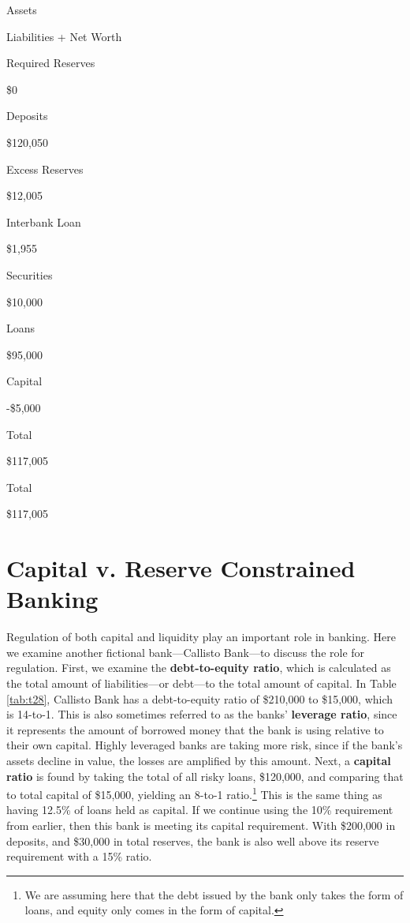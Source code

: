 \documentclass[
]{book}
\begin{document}
Assets

Liabilities + Net Worth

Required Reserves

\$0

Deposits

\$120,050

Excess Reserves

\$12,005

Interbank Loan

\$1,955

Securities

\$10,000

Loans

\$95,000

Capital

-\$5,000

Total

\$117,005

Total

\$117,005

\hypertarget{capital-v.-reserve-constrained-banking}{%
\section{Capital v. Reserve Constrained Banking}\label{capital-v.-reserve-constrained-banking}}

Regulation of both capital and liquidity play an important role in banking. Here we examine another fictional bank---Callisto Bank---to discuss the role for regulation. First, we examine the \textbf{debt-to-equity ratio}, which is calculated as the total amount of liabilities---or debt---to the total amount of capital. In Table \ref{tab:t28}, Callisto Bank has a debt-to-equity ratio of \$210,000 to \$15,000, which is 14-to-1. This is also sometimes referred to as the banks' \textbf{leverage ratio}, since it represents the amount of borrowed money that the bank is using relative to their own capital. Highly leveraged banks are taking more risk, since if the bank's assets decline in value, the losses are amplified by this amount. Next, a \textbf{capital ratio} is found by taking the total of all risky loans, \$120,000, and comparing that to total capital of \$15,000, yielding an 8-to-1 ratio.\footnote{We are assuming here that the debt issued by the bank only takes the form of loans, and equity only comes in the form of capital.} This is the same thing as having 12.5\% of loans held as capital. If we continue using the 10\% requirement from earlier, then this bank is meeting its capital requirement. With \$200,000 in deposits, and \$30,000 in total reserves, the bank is also well above its reserve requirement with a 15\% ratio.
\end{document}
